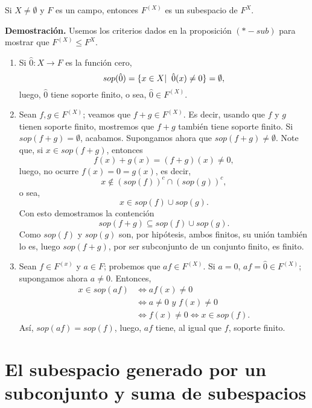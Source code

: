 \begin{prop}
Si $X \neq \emptyset$ y $F$ es un campo, entonces
$F^{(X)}$ es un subespacio de $F^{X}$.
\end{prop}
\noindent
\textbf{Demostración.}
Usemos los criterios dados en la proposición $(*-sub)$
para mostrar que $F^{(X)} \leq F^{X}$.
\begin{enumerate}
	\item Si $\hat{0}: X \longrightarrow F$ es la función
	cero, 
	\[
	sop(\hat{0}) = \{ x \in X  | \hspace{0.2cm} \hat{0}(x) \neq 0\}
	= \emptyset,
	\]
	luego, $\hat{0}$ tiene soporte finito, o sea, 
	$\hat{0} \in F^{(X)}$.
	
	\item Sean $f, g \in F^{(X)}$; veamos que $f + g \in F^{(X)}$.
	Es decir, usando que $f$ y $g$ tienen soporte finito, mostremos
	que $f+g$ también tiene soporte finito.
	Si $sop(f + g) = \emptyset$, acabamos. Supongamos ahora
	que $sop(f+g) \neq \emptyset$. Note que, si 
	$x \in sop(f+g)$, entonces
	\[
	f(x) + g(x) = (f+g)(x) \neq 0,
	\]	
	luego, no ocurre $f(x) = 0 = g(x)$, es decir,
	\[
	x \not\in (sop(f))^{c} \cap (sop(g))^{c},
	\]
	o sea, 
	\[
	x \in sop(f) \cup sop(g).
	\]
	Con esto demostramos la contención
	\[
	sop(f+g) \subseteq sop(f) \cup sop(g).
	\]
	Como $sop(f)$ y $sop(g)$ son, por hipótesis, ambos
	finitos, su unión también lo es, luego
	$sop(f+g)$, por ser subconjunto de un conjunto finito,
	es finito.
	
	\item Sean $f \in F^{(x)}$ y $a \in F$; probemos que
	$af \in F^{(X)}$. Si $a = 0$, 
	$a f = \hat{0} \in F^{(X)}$; supongamos ahora $a \neq 0$.
	Entonces,
	\begin{align*}
	x \in sop(af) & \Leftrightarrow  af(x) \neq 0 \\
	& \Leftrightarrow  a \neq 0 \textit{ y } f(x) \neq 0 \\
	& \Leftrightarrow  f(x) \neq 0 
	\Leftrightarrow x \in sop(f).
	\end{align*}
	Así, $sop(a f) = sop(f)$, luego, $af$ tiene, al igual
	que $f$, soporte finito.
\end{enumerate}

\QEDB
\vspace{0.2cm}

\section{El subespacio generado por un subconjunto y suma de subespacios}



